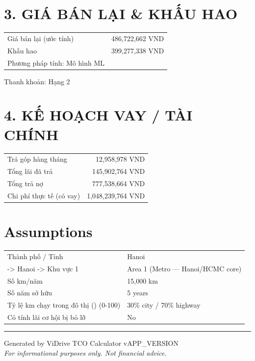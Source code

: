 \documentclass[11pt,a4paper]{article}
\begin{document}
\section*{3. GIÁ BÁN LẠI \& KHẤU HAO}
\begin{tabular}{l r}
\toprule
Giá bán lại (ước tính) & 486,722,662 VND \\
Khấu hao & 399,277,338 VND \\
Phương pháp tính: Mô hình ML &  \\
\bottomrule
\end{tabular}
\vspace{0.3cm}Thanh khoản: Hạng 2

\section*{4. KẾ HOẠCH VAY / TÀI CHÍNH}
\begin{tabular}{l r}
\toprule
Trả góp hàng tháng & 12,958,978 VND \\
Tổng lãi đã trả & 145,902,764 VND \\
Tổng trả nợ & 777,538,664 VND \\
Chi phí thực tế (có vay) & 1,048,239,764 VND \\
\bottomrule
\end{tabular}
\vspace{0.3cm}\section*{Assumptions}
\begin{center}
\begin{tabular}{l l}
\toprule
Thành phố / Tỉnh & Hanoi \\
  -> Hanoi -> Khu vực 1 & Area 1 (Metro — Hanoi/HCMC core) \\
Số km/năm & 15,000 km \\
Số năm sở hữu & 5 years \\
  Tỷ lệ km chạy trong đô thị () (0-100) & 30\% city / 70\% highway \\
  Có tính lãi cơ hội bị bỏ lỡ & No \\
\bottomrule
\end{tabular}
\end{center}
\vspace{0.5cm}
\vspace{1cm}
\hrule
\vspace{0.3cm}
\begin{center}
    {\small Generated by ViDrive TCO Calculator v{APP_VERSION}}\\
    {\small \textit{For informational purposes only. Not financial advice.}}
\end{center}
\end{document}
